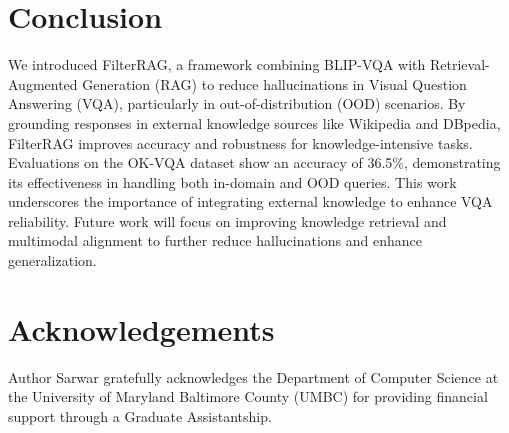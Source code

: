 \section{Conclusion}
\label{sec:Conclusion}
We introduced FilterRAG, a framework combining BLIP-VQA with Retrieval-Augmented Generation (RAG) to reduce hallucinations in Visual Question Answering (VQA), particularly in out-of-distribution (OOD) scenarios. By grounding responses in external knowledge sources like Wikipedia and DBpedia, FilterRAG improves accuracy and robustness for knowledge-intensive tasks. Evaluations on the OK-VQA dataset show an accuracy of 36.5\%, demonstrating its effectiveness in handling both in-domain and OOD queries. This work underscores the importance of integrating external knowledge to enhance VQA reliability. Future work will focus on improving knowledge retrieval and multimodal alignment to further reduce hallucinations and enhance generalization.

\section{Acknowledgements}
Author Sarwar gratefully acknowledges the Department of Computer Science at the University of Maryland Baltimore County (UMBC) for providing financial support through a Graduate Assistantship.